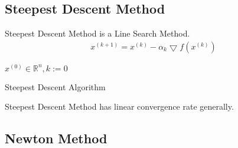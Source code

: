 \documentclass[runningheads]{llncs}
\begin{document}
\subsection{Steepest Descent Method}
Steepest Descent Method is a Line Search Method.
\begin{align}
    x^{(k+1)} = x^{(k)} - \alpha_k \bigtriangledown f(x^{(k)})
\end{align}

\begin{algorithm}[H]
    \SetAlgoLined
     $x^{(0)} \in \mathbb{R}^n, k:= 0$\;
     \caption{Steepest Descent Algorithm}
\end{algorithm}
Steepest Descent Method has linear convergence rate generally.

\subsection{Newton Method}
\end{document}
